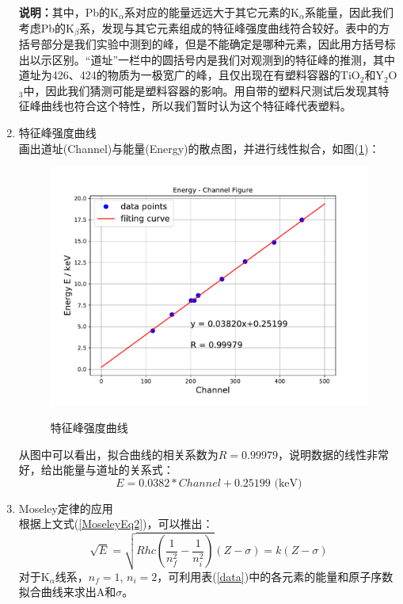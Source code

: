 \documentclass[a4paper]{article}
\begin{document}
\begin{enumerate}
\textbf{说明：}其中，Pb的K$_{\alpha}$系对应的能量远远大于其它元素的K$_{\alpha}$系能量，因此我们考虑Pb的K$_{\beta}$系，发现与其它元素组成的特征峰强度曲线符合较好。表中的方括号部分是我们实验中测到的峰，但是不能确定是哪种元素，因此用方括号标出以示区别。“道址”一栏中的圆括号内是我们对观测到的特征峰的推测，其中道址为426、424的物质为一极宽广的峰，且仅出现在有塑料容器的TiO$_2$和Y$_2$O$_3$中，因此我们猜测可能是塑料容器的影响。用自带的塑料尺测试后发现其特征峰曲线也符合这个特性，所以我们暂时认为这个特征峰代表塑料。
\item 特征峰强度曲线\\
画出道址(Channel)与能量(Energy)的散点图，并进行线性拟合，如图(\ref{E-Channel})：
\begin{figure}[!h]
\centering
\includegraphics[width=12cm]{fig/E_Channel.pdf}\\
\caption{特征峰强度曲线}\label{E-Channel}
\end{figure}
从图中可以看出，拟合曲线的相关系数为$R = 0.99979$，说明数据的线性非常好，给出能量与道址的关系式：
\begin{equation}
E = 0.0382*Channel+0.25199 \text{ (keV)}\label{E-Channel_Eqn}
\end{equation}
\item Moseley定律的应用\\
根据上文式(\ref{MoseleyEq2})，可以推出：
\begin{equation}
\sqrt{E} = \sqrt{Rhc\left(\frac{1}{n_f^2} - \frac{1}{n_i^2}\right)}(Z-\sigma) = k(Z-\sigma)
\end{equation}
对于K$_{\alpha}$线系，$n_f = 1$, $n_i = 2$，可利用表(\ref{data})中的各元素的能量和原子序数拟合曲线来求出A和$\sigma$。
\begin{table}[!h]
\centering

\end{table}
\end{enumerate}
\end{document}
